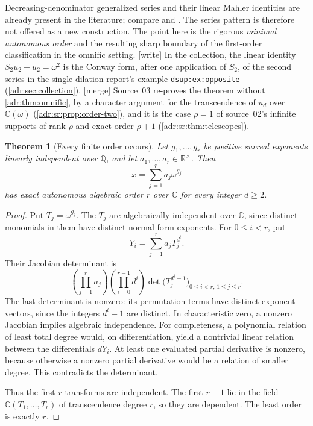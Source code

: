 \documentclass[11pt,letterpaper]{article}
\numberwithin{equation}{section}
\newtheorem{theorem}{Theorem}[section]
\theoremstyle{definition}
\theoremstyle{remark}
\newcommand{\C}{\mathbb C}
\newcommand{\R}{\mathbb R}
\newcommand{\Q}{\mathbb Q}
\newcommand{\lbl}[1]{\nolinkurl{#1}}%
\newcommand{\wtag}{\textup{[write]}}%
\newcommand{\mtag}{\textup{[merge]}}%
\begin{document}
Decreasing-denominator generalized series and their linear Mahler
identities are already present in the literature; compare
\cite[Remark~2.18]{CDDM} and \cite{GG}. The series pattern is therefore
not offered as a new construction. The point here is the rigorous
\emph{minimal autonomous order} and the resulting sharp boundary of the
first-order classification in the omnific setting.
\wtag{} In the collection, the linear identity $S_2u_2-u_2=\omega^2$ is
the Conway form, after one application of $S_2$, of the second series in
the single-dilation report's example \lbl{dsup:ex:opposite}
(\cref{adr:sec:collection}).
\mtag{} Source~03 re-proves the theorem without \cref{adr:thm:omnific}, by a
character argument for the transcendence of $u_d$ over $\C(\omega)$
(\cref{adr:sr:prop:order-two}), and it is the case $\rho=1$ of source~02's
infinite supports of rank $\rho$ and exact order $\rho+1$
(\cref{adr:sr:thm:telescopes}).

\begin{theorem}[Every finite order occurs]\label{adr:thm:all-orders}
Let $g_1,\ldots,g_r$ be positive surreal exponents linearly independent
over $\Q$, and let $a_1,\ldots,a_r\in\R^\times$. Then
\[
 x=\sum_{j=1}^r a_j\omega^{g_j}
\]
has exact autonomous algebraic order $r$ over $\C$ for every integer
$d\ge2$.
\end{theorem}
\begin{proof}
Put $T_j=\omega^{g_j}$. The $T_j$ are algebraically independent over
$\C$, since distinct monomials in them have distinct normal-form
exponents. For $0\le i<r$, put
\[
 Y_i=\sum_{j=1}^r a_jT_j^{d^i}.
\]
Their Jacobian determinant is
\begin{equation}\label{adr:eq:jacobian}
 \left(\prod_{j=1}^r a_j\right)
 \left(\prod_{i=0}^{r-1}d^i\right)
 \det\bigl(T_j^{d^i-1}\bigr)_{0\le i<r,\,1\le j\le r}.
\end{equation}
The last determinant is nonzero: its permutation terms have distinct
exponent vectors, since the integers $d^i-1$ are distinct.
In characteristic zero, a nonzero Jacobian implies algebraic
independence. For completeness, a polynomial relation of least total
degree would, on differentiation, yield a nontrivial linear relation
between the differentials $dY_i$. At least one evaluated partial
derivative is nonzero, because otherwise a nonzero partial derivative
would be a relation of smaller degree. This contradicts the determinant.

Thus the first $r$ transforms are independent. The first $r+1$ lie in
the field $\C(T_1,\ldots,T_r)$ of transcendence degree $r$, so they are
dependent. The least order is exactly $r$.
\end{proof}
\end{document}
